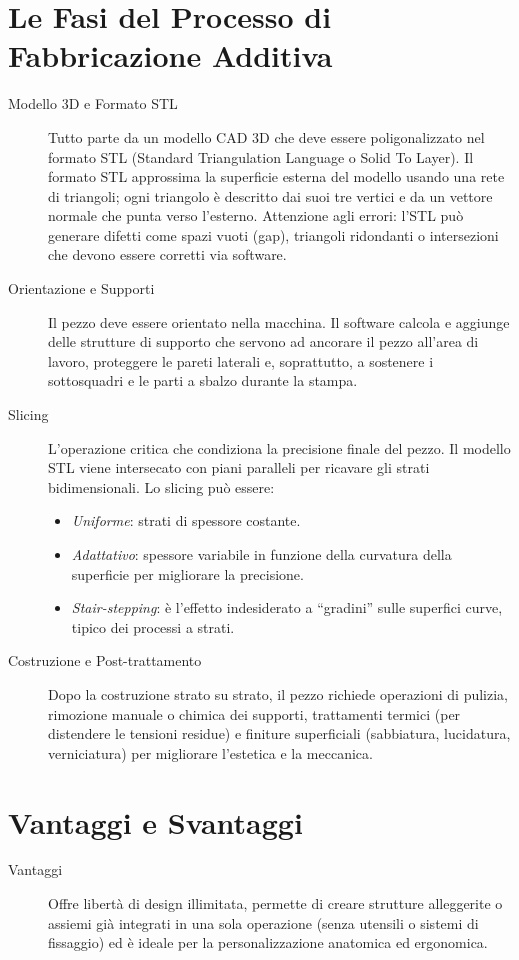 %
\section{Le Fasi del Processo di Fabbricazione Additiva}
\begin{description}
    \item [Modello 3D e Formato STL] Tutto parte da un modello CAD 3D che deve essere poligonalizzato nel formato STL (Standard Triangulation Language o Solid To Layer). Il formato STL approssima la superficie esterna del modello usando una rete di triangoli; ogni triangolo è descritto dai suoi tre vertici e da un vettore normale che punta verso l'esterno. Attenzione agli errori: l'STL può generare difetti come spazi vuoti (gap), triangoli ridondanti o intersezioni che devono essere corretti via software.
    \item [Orientazione e Supporti] Il pezzo deve essere orientato nella macchina. Il software calcola e aggiunge delle strutture di supporto che servono ad ancorare il pezzo all'area di lavoro, proteggere le pareti laterali e, soprattutto, a sostenere i sottosquadri e le parti a sbalzo durante la stampa.
    \item [Slicing] L'operazione critica che condiziona la precisione finale del pezzo. Il modello STL viene intersecato con piani paralleli per ricavare gli strati bidimensionali. Lo slicing può essere:
          \begin{itemize}
              \item \emph{Uniforme}: strati di spessore costante.
              \item \emph{Adattativo}: spessore variabile in funzione della curvatura della superficie per migliorare la precisione.
              \item \emph{Stair-stepping}: è l'effetto indesiderato a ``gradini'' sulle superfici curve, tipico dei processi a strati.
          \end{itemize}
    \item [Costruzione e Post-trattamento] Dopo la costruzione strato su strato, il pezzo richiede operazioni di pulizia, rimozione manuale o chimica dei supporti, trattamenti termici (per distendere le tensioni residue) e finiture superficiali (sabbiatura, lucidatura, verniciatura) per migliorare l'estetica e la meccanica.
\end{description}

%
\section{Vantaggi e Svantaggi}
\begin{description}
    \item [Vantaggi] Offre libertà di design illimitata, permette di creare strutture alleggerite o assiemi già integrati in una sola operazione (senza utensili o sistemi di fissaggio) ed è ideale per la personalizzazione anatomica ed ergonomica.
\end{description}
